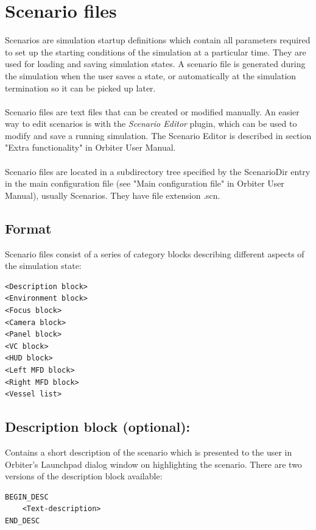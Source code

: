 \documentclass[Orbiter Developer Manual.tex]{subfiles}
\begin{document}
\section{Scenario files}
\label{sec:scn_files}
Scenarios are simulation startup definitions which contain all parameters required to set up the starting conditions of the simulation at a particular time. They are used for loading and saving simulation states. A scenario file is generated during the simulation when the user saves a state, or automatically at the simulation termination so it can be picked up later.\\
\\
Scenario files are text files that can be created or modified manually. An easier way to edit scenarios is with the \textit{Scenario Editor} plugin, which can be used to modify and save a running simulation. The Scenario Editor is described in section "Extra functionality" in Orbiter User Manual.\\
\\
Scenario files are located in a subdirectory tree specified by the ScenarioDir entry in the main configuration file (see "Main configuration file" in Orbiter User Manual), usually Scenarios. They have file extension .scn.


\subsection*{Format}
Scenario files consist of a series of category blocks describing different aspects of the simulation state:

\begin{lstlisting}[language=OSFS]
<Description block>
<Environment block>
<Focus block>
<Camera block>
<Panel block>
<VC block>
<HUD block>
<Left MFD block>
<Right MFD block>
<Vessel list>
\end{lstlisting}


\subsection*{Description block (optional):}
Contains a short description of the scenario which is presented to the user in Orbiter's Launchpad dialog window on highlighting the scenario. There are two versions of the description block available:

\begin{lstlisting}[language=OSFS]
BEGIN_DESC
	<Text-description>
END_DESC
\end{lstlisting}
\end{document}
